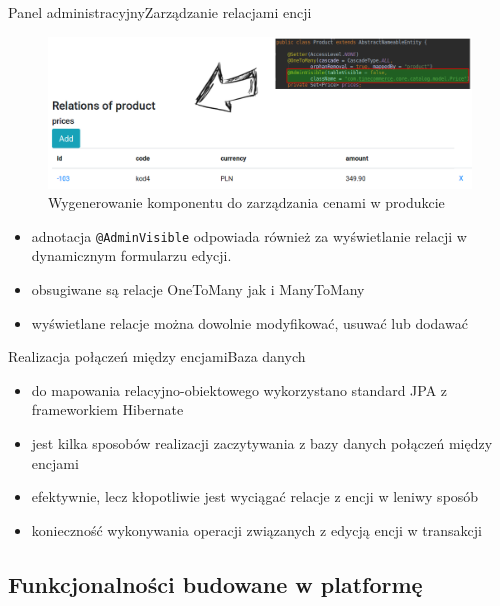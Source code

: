 \documentclass[polish,xcolor=table,9pt,aspectratio=1610,hyperref={pdfpagemode=FullScreen}]{beamer}
\begin{document}
\begin{frame}{Panel administracyjny}{Zarządzanie relacjami encji}

	\begin{figure}
		\begin{center}
			\includegraphics[scale=0.25]{relacjeWDFE.png}
		\end{center}
		\caption{{\color{black}Wygenerowanie komponentu do zarządzania cenami w produkcie}} 
	\end{figure}
\begin{itemize}
	\item<1-> adnotacja \texttt{@AdminVisible} odpowiada również za wyświetlanie relacji w dynamicznym formularzu edycji. 
	\item<1-> obsugiwane są relacje OneToMany jak i ManyToMany
	\item<1-> wyświetlane relacje można dowolnie modyfikować, usuwać lub dodawać
\end{itemize}
\end{frame}

\begin{frame}{Realizacja połączeń między encjami}{Baza danych}
\begin{itemize}
	\item<1-> do mapowania relacyjno-obiektowego wykorzystano standard JPA z frameworkiem Hibernate
	\item<1-> jest kilka sposobów realizacji zaczytywania z bazy danych połączeń między encjami
	\item<1-> efektywnie, lecz kłopotliwie jest wyciągać relacje z encji w leniwy sposób
	\item<1-> konieczność wykonywania operacji związanych z edycją encji w transakcji 
\end{itemize}
\end{frame}



\subsection{Funkcjonalności budowane w platformę}
\end{document}
